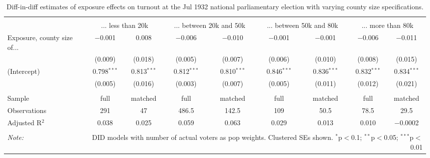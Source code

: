 
\begin{table}[!htbp] \centering 
  \caption{Diff-in-diff estimates of exposure effects on turnout at the Jul 1932 national parliamentary election with varying county size specifications.\vspace{-.25cm}} 
  \label{tab:turnout-countysize-dd-1932-1} 
\scriptsize 
\begin{tabular}{@{\extracolsep{5pt}}lcccccccc} 
\\[-1.8ex]\hline 
\hline \\[-1.8ex] 
 & \multicolumn{2}{c}{... less than 20k } & \multicolumn{2}{c}{... between 20k and 50k} & \multicolumn{2}{c}{... between 50k and 80k} & \multicolumn{2}{c}{... more than 80k} \\ 
 \cmidrule(r){2-3}\cmidrule(r){4-5}\cmidrule(r){6-7}\cmidrule(r){8-9}Exposure, county size of... & $-$0.001 & 0.008 & $-$0.006 & $-$0.010 & $-$0.001 & $-$0.001 & $-$0.006 & $-$0.011 \\ 
  & (0.009) & (0.018) & (0.005) & (0.007) & (0.006) & (0.010) & (0.008) & (0.015) \\ 
  (Intercept) & 0.798$^{***}$ & 0.813$^{***}$ & 0.812$^{***}$ & 0.810$^{***}$ & 0.846$^{***}$ & 0.836$^{***}$ & 0.832$^{***}$ & 0.834$^{***}$ \\ 
  & (0.005) & (0.016) & (0.003) & (0.007) & (0.005) & (0.011) & (0.012) & (0.021) \\ 
 \hline \\[-1.8ex] 
Sample & full & matched & full & matched & full & matched & full & matched \\ 
Observations & 291 & 47 & 486.5 & 142.5 & 109 & 50.5 & 78.5 & 29.5 \\ 
Adjusted R$^{2}$ & 0.038 & 0.025 & 0.059 & 0.063 & 0.029 & 0.013 & 0.010 & $-$0.0002 \\ 
\hline 
\hline \\[-1.8ex] 
\textit{Note:}  & \multicolumn{8}{r}{DID models with number of actual voters as pop weights. Clustered SEs shown. $^{*}$p$<$0.1; $^{**}$p$<$0.05; $^{***}$p$<$0.01} \\ 
\end{tabular} 
\end{table} 
